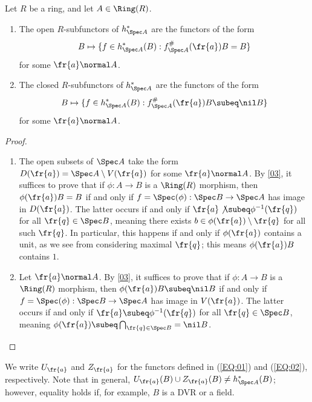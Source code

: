 \documentclass[10pt,oneside,final]{amsart}
\begin{document}
\begin{prop}
Let $R$ be a ring, and let $A \in \Ring(R)$.
\begin{enumerate}
\item 	The open $R$-subfunctors of $h_{\Spec A}^\ast$ are the functors of the form
\begin{align}\label{EQ:01}
B \mapsto \{f \in h_{\Spec A}^\ast(B) : f_{\Spec A}^\#(\fr{a})B = B\}
\end{align}
for some $\fr{a} \normal A$.
\item 	The closed $R$-subfunctors of $h_{\Spec A}^\ast$ are the functors of the form
\begin{align}\label{EQ:02}
B \mapsto \{f \in h_{\Spec A}^\ast(B) : f_{\Spec A}^\#(\fr{a})B \subeq \nil B\}
\end{align}
for some $\fr{a} \normal A$.
\end{enumerate}
\end{prop}

\begin{proof}\mbox{}
\begin{enumerate}
\item 	The open subsets of $\Spec A$ take the form $D(\fr{a}) = \Spec A \setminus V(\fr{a})$ for some $\fr{a} \normal A$.
			By \ref{03}, it suffices to prove that if $\phi : A \to B$ is a $\Ring(R)$ morphism, then $\phi(\fr{a})B = B$ if and only if $f = \Spec(\phi) : \Spec B \to \Spec A$ has image in $D(\fr{a})$.
			The latter occurs if and only if $\fr{a} \not\subeq \phi^{-1}(\fr{q})$ for all $\fr{q} \in \Spec B$, meaning there exists $b \in \phi(\fr{a})\setminus \fr{q}$ for all such $\fr{q}$.
			In particular, this happens if and only if $\phi(\fr{a})$ contains a unit, as we see from considering maximal $\fr{q}$; this means $\phi(\fr{a})B$ contains $1$.
\item 	Let $\fr{a} \normal A$.
			By \ref{03}, it suffices to prove that if $\phi : A \to B$ is a $\Ring(R)$ morphism, then $\phi(\fr{a})B\subeq \nil B$ if and only if $f = \Spec(\phi) : \Spec B \to \Spec A$ has image in $V(\fr{a})$.
			The latter occurs if and only if $\fr{a} \subeq \phi^{-1}(\fr{q})$ for all $\fr{q} \in \Spec B$, meaning $\phi(\fr{a}) \subeq \bigcap_{\fr{q} \in \Spec B} = \nil B$.
\end{enumerate}
\end{proof}

We write $U_\fr{a}$ and $Z_\fr{a}$ for the functors defined in (\ref{EQ:01}) and (\ref{EQ:02}), respectively.
Note that in general, $U_\fr{a}(B) \cup Z_\fr{a}(B) \neq h_{\Spec A}^\ast(B)$; however, equality holds if, for example, $B$ is a DVR or a field.
\end{document}
